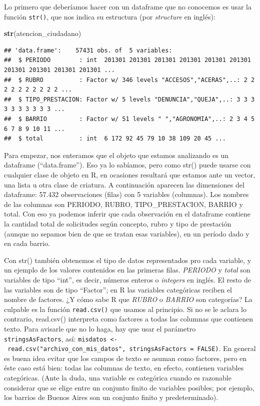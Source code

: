 \documentclass[spanish,]{book}
\newenvironment{Shaded}{\begin{snugshade}}{\end{snugshade}}
\newcommand{\KeywordTok}[1]{\textcolor[rgb]{0.13,0.29,0.53}{\textbf{#1}}}
\newcommand{\NormalTok}[1]{#1}
\begin{document}
Lo primero que deberíamos hacer con un dataframe que no conocemos es usar la función \texttt{str()}, que nos indica su estructura (por \emph{structure} en inglés):

\begin{Shaded}
\begin{Highlighting}[]
\KeywordTok{str}\NormalTok{(atencion_ciudadano)}
\end{Highlighting}
\end{Shaded}

\begin{verbatim}
## 'data.frame':    57431 obs. of  5 variables:
##  $ PERIODO        : int  201301 201301 201301 201301 201301 201301 201301 201301 201301 201301 ...
##  $ RUBRO          : Factor w/ 346 levels "ACCESOS","ACERAS",..: 2 2 2 2 2 2 2 2 2 2 ...
##  $ TIPO_PRESTACION: Factor w/ 5 levels "DENUNCIA","QUEJA",..: 3 3 3 3 3 3 3 3 3 3 ...
##  $ BARRIO         : Factor w/ 51 levels " ","AGRONOMIA",..: 2 3 4 5 6 7 8 9 10 11 ...
##  $ total          : int  6 172 92 45 79 10 38 109 20 45 ...
\end{verbatim}

Para empezar, nos enteramos que el objeto que estamos analizando es un dataframe (``data.frame''). Eso ya lo sabíamos, pero como str() puede usarse con cualquier clase de objeto en R, en ocasiones resultará que estamos ante un vector, una lista u otra clase de criatura. A continuación aparecen las dimensiones del dataframe: 57.432 observaciones (filas) con 5 variables (columnas). Los nombres de las columnas son PERIODO, RUBRO, TIPO\_PRESTACION, BARRIO y total. Con eso ya podemos inferir que cada observación en el dataframe contiene la cantidad total de solicitudes según concepto, rubro y tipo de prestación (aunque no sepamos bien de que se tratan esas variables), en un período dado y en cada barrio.

Con str() también obtenemos el tipo de datos representados pro cada variable, y un ejemplo de los valores contenidos en las primeras filas. \emph{PERIODO} y \emph{total} son variables de tipo ``int'', es decir, números enteros o \emph{integers} en inglés. El resto de las variables son de tipo ``Factor''; en R las variables categóricas reciben el nombre de factores. ¿Y cómo sabe R que \emph{RUBRO} o \emph{BARRIO} son categorías? La culpable es la función \texttt{read.csv()} que usamos al principio. Si no se le aclara lo contrario, read.csv() interpreta como factores a todas las columnas que contienen texto. Para avisarle que no lo haga, hay que usar el parámetro \texttt{stringsAsFactors}, así: \texttt{misdatos\ \textless{}-\ read.csv("archivo\_con\_mis\_datos",\ stringsAsFactors\ =\ FALSE)}. En general es buena idea evitar que los campos de texto se asuman como factores, pero en éste caso está bien: todas las columnas de texto, en efecto, contienen variables categóricas. (Ante la duda, una variable es categórica cuando es razonable considerar que se elige entre un conjunto finito de variables posibles; por ejemplo, los barrios de Buenos Aires son un conjunto finito y predeterminado).
\end{document}
